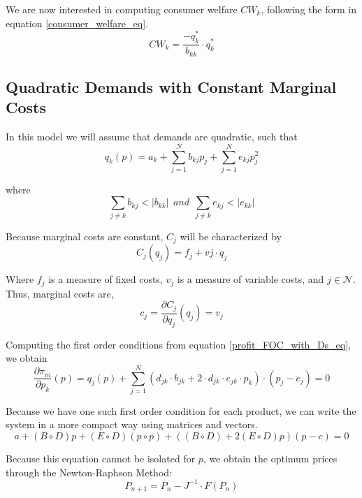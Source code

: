\documentclass[12pt]{article}
\begin{document}
We are now interested in computing consumer welfare $CW_k$, following the form in equation \ref{consumer_welfare_eq}.
\begin{equation*}
CW_k = \frac{-q_k^*}{b_{kk}} \cdot q_k^*
\end{equation*}

\subsection{Quadratic Demands with Constant Marginal Costs}

In this model we will assume that demands are quadratic, such that
\begin{equation*}
q_k(p) = a_k + \sum_{j=1}^N b_{kj}p_j + \sum_{j=1}^N e_{kj} p_j^2
\end{equation*}

where
\begin{equation*}
\sum_{j \neq k} b_{kj} < |b_{kk}| \ \ and \ \ \sum_{j \neq k} e_{kj} < |e_{kk}|
\end{equation*}

Because marginal costs are constant, $C_j$ will be characterized by 
\begin{equation*}
C_j(q_j) = f_j + vj \cdot q_j
\end{equation*}

Where $f_j$ is a measure of fixed costs, $v_j$ is a measure of variable costs, and $j \in \mathcal{N}$. Thus, marginal costs are,
\begin{equation*}
c_j = \frac{\partial C_j}{\partial q_j}(q_j) = v_j
\end{equation*}

Computing the first order conditions from equation \ref{profit_FOC_with_Ds_eq}, we obtain
\begin{equation*}
\frac{\partial \pi_m}{\partial p_k}(p) = q_j(p) + \sum_{j=1}^N (d_{jk} \cdot b_{jk} + 2 \cdot d_{jk} \cdot e_{jk} \cdot p_k) \cdot (p_j - c_j) = 0
\end{equation*}

Because we have one such first order condition for each product, we can write the system in a more compact way using matrices and vectors.
\begin{equation*}
a +(B \circ D) p + (E \circ D) (p \circ p) + ((B \circ D) + 2 (E \circ D) p) (p - c) = 0 
\end{equation*}

Because this equation cannot be isolated for $p$, we obtain the optimum prices through the Newton-Raphson Method:
\begin{equation*}
P_{n+1} = P_n - J^{-1} \cdot F(P_n)
\end{equation*}
\end{document}
